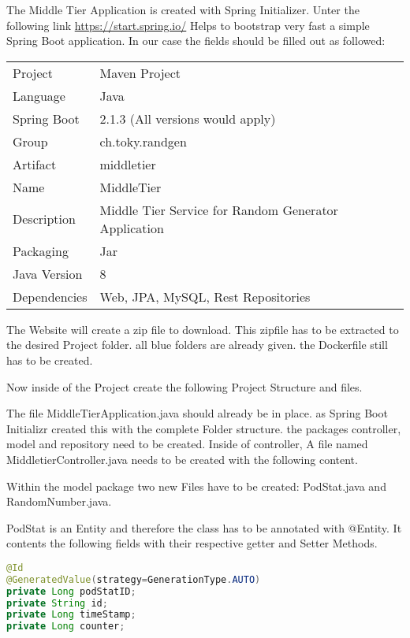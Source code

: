 The Middle Tier Application is created with Spring Initializer.
Unter the following link \url{https://start.spring.io/} Helps to bootstrap very fast a simple Spring Boot application.
In our case the fields should be filled out as followed:
\begin{tabbing}
\begin{tabular}{ll}
Project & Maven Project \\
Language & Java \\
Spring Boot & 2.1.3 (All versions would apply) \\
Group & ch.toky.randgen \\
Artifact & middletier \\
Name & MiddleTier \\
Description & Middle Tier Service for Random Generator Application \\
Packaging & Jar \\
Java Version & 8 \\
Dependencies & Web, JPA, MySQL, Rest Repositories
\end{tabular}
\end{tabbing}
The Website will create a zip file to download. This zipfile has to be extracted to the desired Project folder.
all blue folders are already given. the Dockerfile still has to be created.

Now inside of the Project create the following Project Structure and files.

The file MiddleTierApplication.java should already be in place. as Spring Boot Initializr created this with the complete Folder structure. the packages controller, model and repository need to be created.
Inside of controller, A file named MiddletierController.java needs to be created with the following content.

Within the model package two new Files have to be created: PodStat.java and RandomNumber.java.

PodStat is an Entity and therefore the class has to be annotated with @Entity.
It contents the following fields with their respective getter and Setter Methods.
\begin{lstlisting}[language=Java]
@Id
@GeneratedValue(strategy=GenerationType.AUTO)
private Long podStatID;
private String id;
private Long timeStamp;
private Long counter;
\end{lstlisting}


